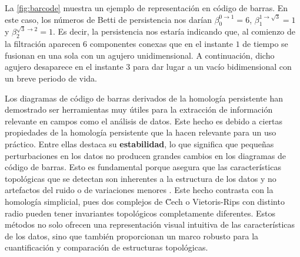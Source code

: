 \begin{ejemplo}
	La \autoref{fig:barcode} muestra un ejemplo de representación en código de barras. En este caso, los números de Betti de persistencia nos darían $\beta_0^{0 \to 1} = 6$, $\beta_1^{1 \to \sqrt{3}} = 1$ y $\beta_2^{\sqrt{3} \to 2} = 1$. Es decir, la persistencia nos estaría indicando que, al comienzo de la filtración aparecen $6$ componentes conexas que en el instante $1$ de tiempo se fusionan en una sola con un agujero unidimensional. A continuación, dicho agujero desaparece en el instante $3$ para dar lugar a un vacío bidimensional con un breve periodo de vida.
\end{ejemplo}

Los diagramas de código de barras derivados de la homología persistente han demostrado ser herramientas muy útiles para la extracción de información relevante en campos como el análisis de datos. Este hecho es debido a ciertas propiedades de la homología persistente que la hacen relevante para un uso práctico. Entre ellas destaca su \textbf{estabilidad}, lo que significa que pequeñas perturbaciones en los datos no producen grandes cambios en los diagramas de código de barras. Esto es fundamental porque asegura que las características topológicas que se detectan son inherentes a la estructura de los datos y no artefactos del ruido o de variaciones menores \cite{cohen2005stability, chazal2016structure}. Este hecho contrasta con la homología simplicial, pues dos complejos de \u Cech o Vietoris-Rips con distinto radio pueden tener invariantes topológicos completamente diferentes. Estos métodos no solo ofrecen una representación visual intuitiva de las características de los datos, sino que también proporcionan un marco robusto para la cuantificación y comparación de estructuras topológicas.

\endinput
